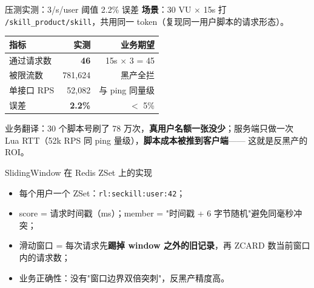 \documentclass[aspectratio=169,11pt]{beamer}
\begin{document}
\begin{frame}[shrink]{压测实测：3/s/user 阈值 2.2\% 误差}
\textbf{场景}：30 VU $\times$ 15s 打 \texttt{/skill\_product/skill}，共用同一 token（复现同一用户脚本的请求形态）。

\vspace{2mm}
\begin{tabular}{@{}lrr@{}}
\toprule
指标       & 实测      & 业务期望 \\
\midrule
通过请求数 & \textbf{46}     & 15s $\times$ 3 = 45 \\
被限流数   & 781{,}624  & 黑产全拦 \\
单接口 RPS & 52{,}082   & 与 ping 同量级 \\
误差       & \textbf{2.2\%} & $<$ 5\% \\
\bottomrule
\end{tabular}
\vspace{2mm}

\small 业务翻译：30 个脚本号刷了 78 万次，\textbf{真用户名额一张没少}；服务端只做一次 Lua RTT（52k RPS 同 ping 量级），\textbf{脚本成本被推到客户端}—— 这就是反黑产的 ROI。
\end{frame}

\begin{frame}[shrink]{SlidingWindow 在 Redis ZSet 上的实现}
\vspace{2mm}
\begin{itemize}
  \item 每个用户一个 ZSet：\texttt{rl:seckill:user:42}；
  \item score = 请求时间戳（ms）；member = "时间戳 + 6 字节随机"避免同毫秒冲突；
  \item 滑动窗口 = 每次请求先\textbf{踢掉 window 之外的旧记录}，再 ZCARD 数当前窗口内的请求数；
  \item 业务正确性：没有"窗口边界双倍突刺"，反黑产精度高。
\end{itemize}
\end{frame}
\end{document}
